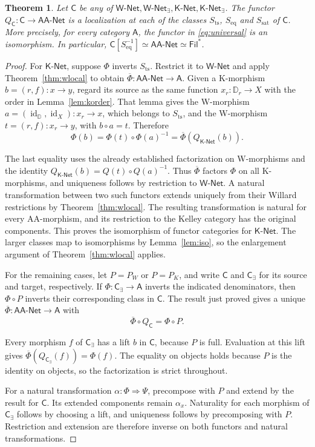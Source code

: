 \documentclass[11pt,a4paper]{article}
\newtheorem{theorem}{Theorem}[section]
\theoremstyle{definition}
\theoremstyle{remark}
\newcommand{\Filp}{\mathsf{Fil}^{*}}
\newcommand{\Wpar}{\mathsf{W\text{-}Net}}
\newcommand{\Kpar}{\mathsf{K\text{-}Net}}
\newcommand{\Wex}{\mathsf{W\text{-}Net}_{\exists}}
\newcommand{\Kex}{\mathsf{K\text{-}Net}_{\exists}}
\newcommand{\NetAA}{\mathsf{AA\text{-}Net}}
\newcommand{\CC}{\mathsf C}
\newcommand{\id}{\operatorname{id}}
\newcommand{\Sts}{S_{\mathrm{ts}}}
\newcommand{\Seq}{S_{\mathrm{eq}}}
\newcommand{\Ssat}{S_{\mathrm{sat}}}
\begin{document}
\begin{theorem}\label{thm:fourlocal}
Let \(\CC\) be any of
\(\Wpar,\Wex,\Kpar,\Kex\). The functor
\(Q_{\CC}:\CC\to\NetAA\) is a localization at each of the classes
\(\Sts\), \(\Seq\) and \(\Ssat\) of \(\CC\). More precisely, for
every category \(\mathsf A\), the functor in \eqref{eq:universal} is
an isomorphism. In particular,
\(\CC[\Seq^{-1}]\simeq\NetAA\simeq\Filp\).
\end{theorem}
\begin{proof}
For \(\Kpar\), suppose \(\Phi\) inverts \(\Sts\). Restrict
it to \(\Wpar\) and apply Theorem~\ref{thm:wlocal} to obtain
\(\overline\Phi:\NetAA\to\mathsf A\). Given a K-morphism
\(b=(r,f):x\to y\), regard its source as the same function
\(x_r:\mathbb D_r\to X\) with the order in
Lemma~\ref{lem:korder}. That lemma gives the W-morphism
\(a=(\id_{\mathbb D},\id_X):x_r\to x\), which belongs to
\(\Sts\), and the W-morphism \(t=(r,f):x_r\to y\), with
\(b\circ a=t\). Therefore
\[
 \Phi(b)=\Phi(t)\circ\Phi(a)^{-1}
        =\overline\Phi(Q_{\Kpar}(b)).
\]

The last equality uses the already established factorization on
W-morphisms and the identity
\(Q_{\Kpar}(b)=Q(t)\circ Q(a)^{-1}\). Thus
\(\overline\Phi\) factors \(\Phi\) on all K-morphisms, and
uniqueness follows by restriction to \(\Wpar\).
A natural transformation between two such functors extends uniquely
from their Willard restrictions by Theorem~\ref{thm:wlocal}.
The resulting transformation is natural for every AA-morphism, and its
restriction to the Kelley category has the original components.
This proves the isomorphism of functor categories for \(\Kpar\).
The larger classes map to isomorphisms by Lemma~\ref{lem:iso}, so
the enlargement argument of Theorem~\ref{thm:wlocal} applies.

For the remaining cases, let \(P=P_W\) or \(P=P_K\), and
write \(\CC\) and \(\CC_\exists\) for its source
and target, respectively. If \(\Phi:\CC_\exists\to\mathsf A\) inverts
the indicated denominators, then \(\Phi\circ P\) inverts their
corresponding class in \(\CC\). The result just proved
gives a unique \(\overline\Phi:\NetAA\to\mathsf A\) with
\[
 \overline\Phi\circ Q_{\CC}=\Phi\circ P.
\]

Every morphism \(f\) of \(\CC_\exists\) has a lift \(b\) in
\(\CC\), because \(P\) is full. Evaluation at this
lift gives
\(\overline\Phi(Q_{\CC_\exists}(f))=\Phi(f)\).
The equality on objects holds because \(P\) is the identity on
objects, so the factorization is strict throughout.

For a natural transformation \(\alpha:\Phi\Rightarrow\Psi\),
precompose with \(P\) and extend by the result for
\(\CC\). Its extended components remain \(\alpha_x\).
Naturality for each morphism of \(\CC_\exists\) follows by choosing
a lift, and uniqueness follows by precomposing with \(P\).
Restriction and extension are therefore inverse on both functors
and natural transformations.
\end{proof}
\end{document}
